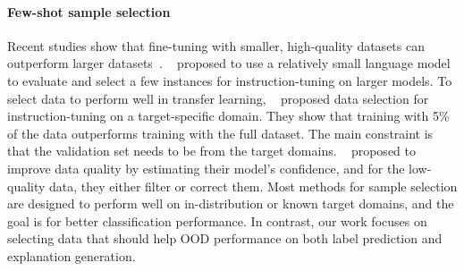 \paragraph{Few-shot sample selection}
Recent studies show that fine-tuning with smaller, high-quality datasets can outperform larger datasets~\cite{li2024superfiltering,xia2024less}.
~\citet{li2024superfiltering} proposed to use a relatively small language model to evaluate and select a few instances for instruction-tuning on larger models.
To select data to perform well in transfer learning, ~\citet{xia2024less} proposed data selection for instruction-tuning on a target-specific domain. 
They show that training with 5\% of the data outperforms training with the full dataset. The main constraint is that the validation set needs to be from the target domains.
~\citet{chen2024automated} proposed to improve data quality by estimating their model's confidence, and for the low-quality data, they either filter or correct them.
Most methods for sample selection are designed to perform well on in-distribution or known target domains, and the goal is for better classification performance. In contrast, our work focuses on selecting data that should help OOD performance on both label prediction and explanation generation.